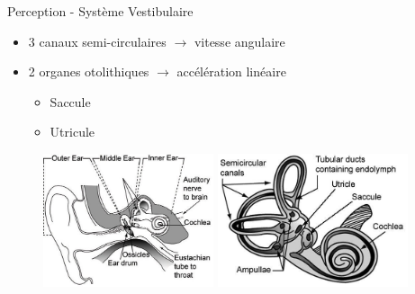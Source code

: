 \documentclass[compress, noflama]{beamer}
\begin{document}
{
\begin{frame}{Perception - Système Vestibulaire}
\begin{itemize}
\item 3 canaux semi-circulaires $\rightarrow$ vitesse angulaire
\item 2 organes otolithiques $\rightarrow$ accélération linéaire
\begin{itemize}
\item Saccule
\item Utricule
\end{itemize}
\end{itemize}
\begin{figure}
\centering
\includegraphics[width=5cm]{images/innerear}
\includegraphics[width=5.6cm]{images/vestibular}
\end{figure}
\end{frame}
}
\end{document}

